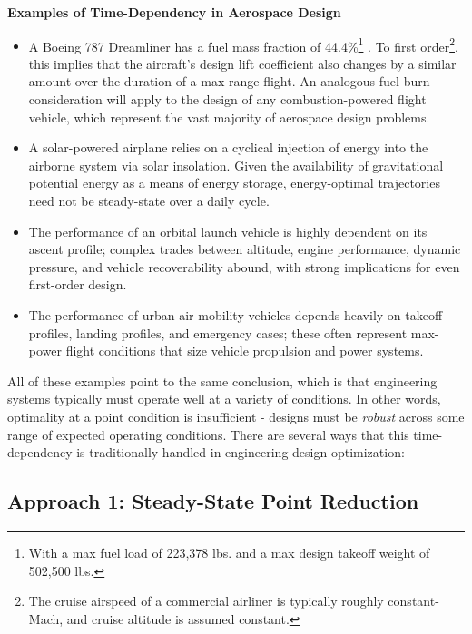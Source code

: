 \begin{example}
    \textbf{Examples of Time-Dependency in Aerospace Design}
    \begin{itemize}
        \item A Boeing 787 Dreamliner has a fuel mass fraction of 44.4\%\footnote{With a max fuel load of 223,378 lbs. and a max design takeoff weight of 502,500 lbs.} \cite{boeing787stats}. To first order\footnote{The cruise airspeed of a commercial airliner is typically roughly constant-Mach, and cruise altitude is assumed constant.}, this implies that the aircraft's design lift coefficient also changes by a similar amount over the duration of a max-range flight. An analogous fuel-burn consideration will apply to the design of any combustion-powered flight vehicle, which represent the vast majority of aerospace design problems.
        \item A solar-powered airplane relies on a cyclical injection of energy into the airborne system via solar insolation. Given the availability of gravitational potential energy as a means of energy storage, energy-optimal trajectories need not be steady-state over a daily cycle.
        \item The performance of an orbital launch vehicle is highly dependent on its ascent profile; complex trades between altitude, engine performance, dynamic pressure, and vehicle recoverability abound, with strong implications for even first-order design.
        \item The performance of urban air mobility vehicles depends heavily on takeoff profiles, landing profiles, and emergency cases; these often represent max-power flight conditions that size vehicle propulsion and power systems.
    \end{itemize} %
\end{example}

All of these examples point to the same conclusion, which is that engineering systems typically must operate well at a variety of conditions. In other words, optimality at a point condition is insufficient - designs must be \textit{robust} across some range of expected operating conditions. There are several ways that this time-dependency is traditionally handled in engineering design optimization:

\subsection{Approach 1: Steady-State Point Reduction}


